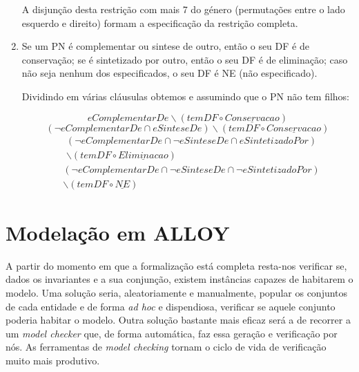 \documentclass[tikz,runningheads,a4paper]{llncs}
\begin{document}
\begin{enumerate}
    A disjunção desta restrição com mais 7 do género (permutações entre o lado esquerdo e direito) formam a especificação da restrição completa.
    
    \item Se um PN é complementar ou sintese de outro, então o seu DF é de conservação; se é sintetizado por outro, então o seu DF é de eliminação; caso não seja nenhum dos especificados, o seu DF é NE (não especificado).
    
    Dividindo em várias cláusulas obtemos e assumindo que o PN não tem filhos:
    
    \begin{equation}
        eComplementarDe \backslash (temDF \circ \underline{Conservacao})
    \end{equation}{}
    \begin{equation}
        (\neg eComplementarDe \cap eSinteseDe) \backslash (temDF \circ \underline{Conservacao})
    \end{equation}{}
    \begin{equation}
    \begin{split}
        & (\neg eComplementarDe \cap \neg eSinteseDe \cap eSintetizadoPor) \\
        & \backslash (temDF \circ \underline{Eliminacao})
    \end{split}{}
    \end{equation}{}
    \begin{equation}
    \begin{split}
        & (\neg eComplementarDe \cap \neg eSinteseDe \cap \neg eSintetizadoPor) \\
        & \backslash (temDF \circ \underline{NE})
    \end{split}{}
    \end{equation}{}
\end{enumerate}

\section{Modelação em ALLOY} \label{SecAlloy}

A partir do momento em que a formalização está completa resta-nos verificar se, dados os invariantes e a sua conjunção, existem instâncias capazes de habitarem o modelo. Uma solução seria, aleatoriamente e manualmente, popular os conjuntos de cada entidade e de forma \textit{ad hoc} e dispendiosa, verificar se aquele conjunto poderia habitar o modelo. Outra solução bastante mais eficaz será a de recorrer a um \textit{model checker} que, de forma automática, faz essa geração e verificação por nós. As ferramentas de \textit{model checking} tornam o ciclo de vida de verificação muito mais produtivo.
\end{document}
